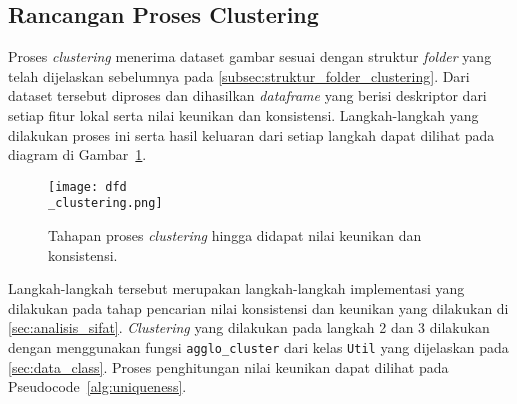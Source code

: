 \subsection{Rancangan Proses Clustering}
\label{subsec:rancangan_proses_clustering}
Proses \textit{clustering} menerima dataset gambar sesuai dengan struktur \textit{folder} yang telah dijelaskan sebelumnya pada \ref{subsec:struktur_folder_clustering}. Dari dataset tersebut diproses dan dihasilkan \textit{dataframe} yang berisi deskriptor dari setiap fitur lokal serta nilai keunikan dan konsistensi. Langkah-langkah yang dilakukan proses ini serta hasil keluaran dari setiap langkah dapat dilihat pada diagram di Gambar~\ref{fig:dfd_clustering}.
\begin{figure}[H]
	\centering
	\texttt{[image: dfd\\\_clustering.png]}
	\caption{Tahapan proses \textit{clustering} hingga didapat nilai keunikan dan konsistensi.}
	\label{fig:dfd_clustering}
\end{figure}
Langkah-langkah tersebut merupakan langkah-langkah implementasi yang dilakukan pada tahap pencarian nilai konsistensi dan keunikan yang dilakukan di \ref{sec:analisis_sifat}. \textit{Clustering} yang dilakukan pada langkah 2 dan 3 dilakukan dengan menggunakan fungsi \texttt{agglo\_cluster} dari kelas \texttt{Util} yang dijelaskan pada \ref{sec:data_class}. Proses penghitungan nilai keunikan dapat dilihat pada Pseudocode~\ref{alg:uniqueness}. \\
